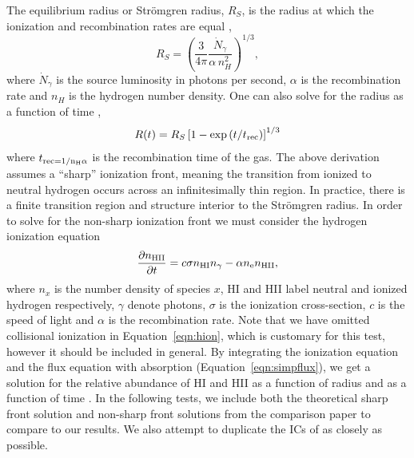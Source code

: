 \documentclass[fleq,usenatbib]{mnras}
\newcommand{\strom}{Str\"omgren}
\begin{document}
{The equilibrium radius or \strom{} radius, $R_S$, is the radius at which the 
ionization and recombination rates are equal \citep[e.g.][]{tielens05},
\begin{equation}
R_S = \left(\frac{3}{4\pi}\frac{\dot{N}_\gamma}{\alpha\, n^2_{H}}\right)^{1/3},
\end{equation}
where $\dot{N}_\gamma$ is the source luminosity in photons per second, 
$\alpha$ is the recombination rate and $n_H$ is the hydrogen number density. 
One can also solve for the radius as a function of time 
\citep[e.g.][]{spitzer78},
\begin{equation}\label{eqn:stromtime}
R(t) = R_S\left[1-\exp\left(t/t_{\rm rec}\right)\right]^{1/3}
\end{equation}
where $t_{\rm rec = 1/{n_H \alpha}}$ is the recombination time of the 
gas. The above derivation assumes a ``sharp'' ionization front, meaning the 
transition from ionized to neutral hydrogen occurs across an infinitesimally 
thin region. In practice, there is a finite transition region and structure
interior to the \strom{} radius. 
In order to solve for the non-sharp ionization front we must consider the 
hydrogen ionization equation
\begin{equation}\label{eqn:hion}
\frac{\partial n_{\rm HII}}{\partial t} = c \sigma n_{\rm HI} n_{\gamma} - 
\alpha n_{\rm e} n_{\rm HII},
\end{equation}
where $n_x$ is the number density of species $x$, HI and HII label neutral 
and ionized hydrogen respectively, $\gamma$ denote photons, $\sigma$ is the 
ionization cross-section, $c$ is the speed of light and $\alpha$ is the 
recombination rate. Note that we have omitted collisional ionization in 
Equation~\ref{eqn:hion}, which is customary for this test, however it 
should be included in general. By integrating the ionization equation and the 
flux equation with absorption (Equation~\ref{eqn:simpflux}), we get a solution 
for the relative abundance of HI and HII as a function of radius and as a 
function of time \citep{osterbrockFerland2006}. In the following tests, we 
include both the theoretical sharp front solution and non-sharp front 
solutions from the \cite{ilievEt06} comparison paper to compare to our 
results. We also attempt to duplicate the ICs of 
\cite{ilievEt06} as closely as possible.

}
\end{document}
